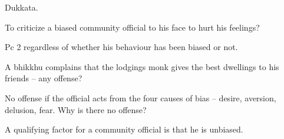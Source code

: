 \begin{solution}
  Dukkata.
\end{solution}

\bigskip

To criticize a biased community official to his face to hurt his feelings?

\begin{solution}
  Pc 2 regardless of whether his behaviour has been biased or not.
\end{solution}

\bigskip

A bhikkhu complains that the lodgings monk gives the best dwellings to his friends – any offense?

\begin{solution}
  No offense if the official acts from the four causes of bias – desire, aversion,
  delusion, fear. Why is there no offense?

  A qualifying factor for a community official is that he is unbiased.
\end{solution}

